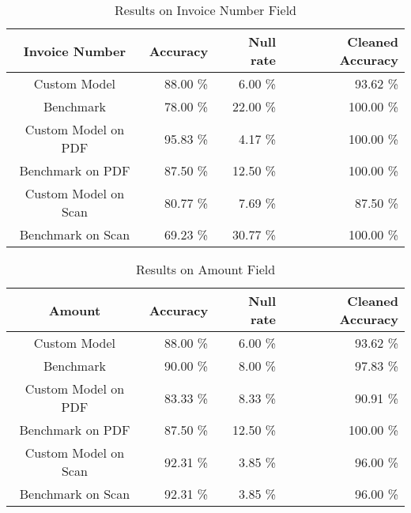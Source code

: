 \begin{table}[ht]   %
    \centering
    \footnotesize
    \begin{tabular}{c|rrr} %
        \toprule    %
        Invoice Number  & Accuracy  & Null rate & Cleaned Accuracy \\
        \midrule    %
        Custom Model               & 88.00 \%   & 6.00 \%   & 93.62 \% \\
        Benchmark           & 78.00 \%   & 22.00 \%  & 100.00 \%\\
        \midrule    %
        Custom Model on PDF        & 95.83 \%   & 4.17 \%  & 100.00 \% \\
        Benchmark on PDF    & 87.50 \%   & 12.50 \%  & 100.00 \% \\
        \midrule    %
        Custom Model on Scan       & 80.77 \%  & 7.69 \%   & 87.50 \% \\
        Benchmark on Scan   & 69.23 \%  & 30.77 \%  & 100.00 \% \\

        \bottomrule %
    \end{tabular}
    \caption{Results on Invoice Number Field}
    \label{table:Model_Bench_Number}
\end{table}
\begin{table}[ht]   %
    \centering
    \footnotesize
    \begin{tabular}{c|rrr} %
        \toprule    %
        Amount  & Accuracy  & Null rate & Cleaned Accuracy \\
        \midrule    %
        Custom Model               & 88.00 \%   & 6.00 \%   & 93.62 \% \\
        Benchmark           & 90.00 \%   & 8.00 \%  & 97.83 \%\\
        \midrule    %
        Custom Model on PDF        & 83.33 \%   & 8.33 \%  & 90.91 \% \\
        Benchmark on PDF    & 87.50 \%   & 12.50 \%  & 100.00 \% \\
        \midrule    %
        Custom Model on Scan       & 92.31 \%  & 3.85 \%   & 96.00 \% \\
        Benchmark on Scan   & 92.31 \%  & 3.85 \%  & 96.00 \% \\

        \bottomrule %
    \end{tabular}
    \caption{Results on Amount Field}
    \label{table:Model_Bench_Amount}
\end{table}
